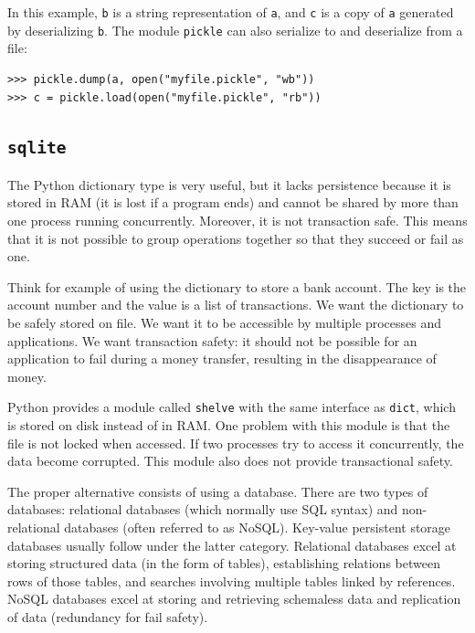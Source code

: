 \documentclass[justified, sixbynine]{tufte-book}
\def\ft{\small\tt}
\theoremstyle{plain}%
\newtheorem * {corollary}{Corollary}
\theoremstyle{definition}
\theoremstyle{remark}
\newtheorem * {remark}{Remark}
\newtheorem * {note}{Note}
\begin{document}
\begin{fullwidth}
In this example, {\ft b} is a string representation of {\ft a}, and {\ft c} is a copy of {\ft a} generated by deserializing {\ft b}.
\noindent The module {\ft pickle} can also serialize to and deserialize from a file:
\begin{lstlisting}
>>> pickle.dump(a, open("myfile.pickle", "wb"))
>>> c = pickle.load(open("myfile.pickle", "rb"))
\end{lstlisting}

\goodbreak\subsection{{\ft sqlite}}


The Python dictionary type is very useful, but it lacks persistence because it is stored in RAM (it is lost if a program ends) and cannot be shared by more than one process running concurrently. Moreover, it is not transaction safe. This means that it is not possible to group operations together so that they succeed or fail as one.

Think for example of using the dictionary to store a bank account. The key is the account number and the value is a list of transactions. We want the dictionary to be safely stored on file. We want it to be accessible by multiple processes and applications. We want transaction safety: it should not be possible for an application to fail during a money transfer, resulting in the disappearance of money.

Python provides a module called {\ft shelve} with the same interface as {\ft dict}, which is stored on disk instead of in RAM. One problem with this module is that the file is not locked when accessed. If two processes try to access it concurrently, the data become corrupted. This module also does not provide transactional safety.

The proper alternative consists of using a database. There are two types of databases: relational databases (which normally use SQL syntax) and non-relational databases (often referred to as NoSQL). Key-value persistent storage databases usually follow under the latter category. Relational databases excel at storing structured data (in the form of tables), establishing relations between rows of those tables, and searches involving multiple tables linked by references. NoSQL databases excel at storing and retrieving schemaless data and replication of data (redundancy for fail safety).


\end{fullwidth}
\end{document}
